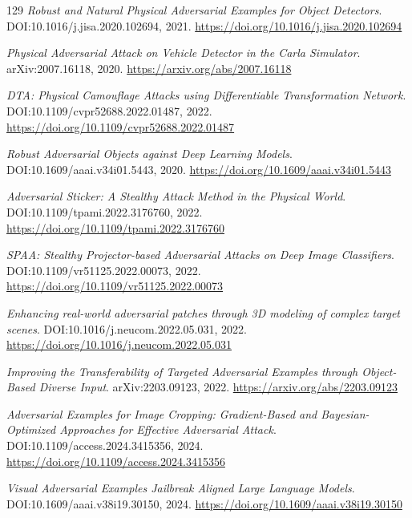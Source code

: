 \documentclass[11pt,a4paper]{article}
\begin{document}
\begin{thebibliography}{129}
\newblock \emph{Robust and Natural Physical Adversarial Examples for Object Detectors}.
\newblock DOI:10.1016/j.jisa.2020.102694, 2021.
\newblock \url{https://doi.org/10.1016/j.jisa.2020.102694}

\newblock \emph{Physical Adversarial Attack on Vehicle Detector in the Carla Simulator}.
\newblock arXiv:2007.16118, 2020.
\newblock \url{https://arxiv.org/abs/2007.16118}

\newblock \emph{DTA: Physical Camouflage Attacks using Differentiable Transformation Network}.
\newblock DOI:10.1109/cvpr52688.2022.01487, 2022.
\newblock \url{https://doi.org/10.1109/cvpr52688.2022.01487}

\newblock \emph{Robust Adversarial Objects against Deep Learning Models}.
\newblock DOI:10.1609/aaai.v34i01.5443, 2020.
\newblock \url{https://doi.org/10.1609/aaai.v34i01.5443}

\newblock \emph{Adversarial Sticker: A Stealthy Attack Method in the Physical World}.
\newblock DOI:10.1109/tpami.2022.3176760, 2022.
\newblock \url{https://doi.org/10.1109/tpami.2022.3176760}

\newblock \emph{SPAA: Stealthy Projector-based Adversarial Attacks on Deep Image Classifiers}.
\newblock DOI:10.1109/vr51125.2022.00073, 2022.
\newblock \url{https://doi.org/10.1109/vr51125.2022.00073}

\newblock \emph{Enhancing real-world adversarial patches through 3D modeling of complex target scenes}.
\newblock DOI:10.1016/j.neucom.2022.05.031, 2022.
\newblock \url{https://doi.org/10.1016/j.neucom.2022.05.031}

\newblock \emph{Improving the Transferability of Targeted Adversarial Examples through Object-Based Diverse Input}.
\newblock arXiv:2203.09123, 2022.
\newblock \url{https://arxiv.org/abs/2203.09123}

\newblock \emph{Adversarial Examples for Image Cropping: Gradient-Based and Bayesian-Optimized Approaches for Effective Adversarial Attack}.
\newblock DOI:10.1109/access.2024.3415356, 2024.
\newblock \url{https://doi.org/10.1109/access.2024.3415356}

\newblock \emph{Visual Adversarial Examples Jailbreak Aligned Large Language Models}.
\newblock DOI:10.1609/aaai.v38i19.30150, 2024.
\newblock \url{https://doi.org/10.1609/aaai.v38i19.30150}


\end{thebibliography}
\end{document}
